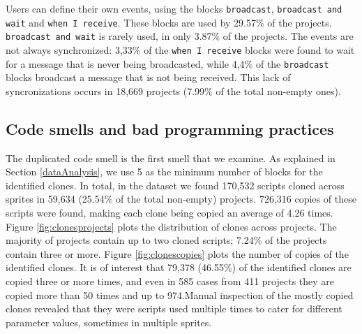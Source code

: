 \documentclass{sig-alternate}
\begin{document}
Users can define their own events, using the blocks \texttt{broadcast}, \texttt{broadcast and wait} and \texttt{when I receive}. 
These blocks are used by 29.57\% of the projects. \texttt{broadcast and wait} is rarely used, in only 3.87\% of the projects. The events are not always synchronized: 3,33\% of the \texttt{when I receive} blocks were found to wait for a message that is never being broadcasted, while 4,4\% of the \texttt{broadcast} blocks broadcast a message that is not being received. This lack of syncronizations occurs in 18,669 projects (7.99\% of the total non-empty ones).

\noindent
{}


\subsection{Code smells and bad programming practices}
\label{RQ3}
The duplicated code smell is the first smell that we examine. As explained in Section \ref{dataAnalysis}, we use 5 as the minimum number of blocks for the identified clones. In total, in the dataset we found 170,532 scripts cloned across sprites in 59,634 (25.54\% of the total non-empty) projects. 726,316 copies of these scripts were found, making each clone being copied an average of 4.26 times. Figure \ref{fig:clonesprojects} plots the distribution of clones across projects. The majority of projects contain up to two cloned scripts; 7.24\% of the projects contain three or more. Figure \ref{fig:clonescopies} plots the number of copies of the identified clones. It is of interest that 79,378 (46.55\%) of the identified clones are copied three or more times, and even in 585 cases from 411 projects they are copied more than 50 times and up to 974.\footnotemark[\ref{repo}] Manual inspection of the mostly copied clones revealed that they were scripts used multiple times to cater for different parameter values, sometimes in multiple sprites.
\end{document}
